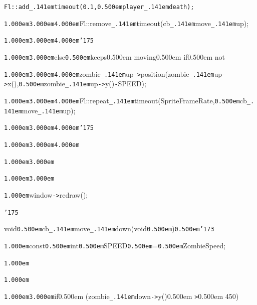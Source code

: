 \documentclass[12pt]{article}
\begin{document}
\noindent
\tt\mc {\tt\mc \kern1.000em}{\tt\mc \kern3.000em}{\tt\mc \kern4.000em}Fl::add{\tt\_\kern.141em}timeout(0.1,{\tt\mc \kern0.500em}player{\tt\_\kern.141em}death);

\noindent
{}{\tt\mc \kern1.000em}{\tt\mc \kern3.000em}{\tt\mc \kern4.000em}Fl::remove{\tt\_\kern.141em}timeout(cb{\tt\_\kern.141em}move{\tt\_\kern.141em}up);

\noindent
{}{\tt\mc \kern1.000em}{\tt\mc \kern3.000em}{\tt\mc \kern4.000em}{\tt\char'175}

\noindent
{}{\tt\mc \kern1.000em}{\tt\mc \kern3.000em}else{\tt\mc \kern0.500em}\rm\mc {\tt /}{\tt /}keeps\kern0.500em moving\kern0.500em if\kern0.500em not

\noindent
\tt{}

\noindent
{}{\tt\mc \kern1.000em}{\tt\mc \kern3.000em}{\tt\mc \kern4.000em}zombie{\tt\_\kern.141em}up{\tt -}{\tt >}position(zombie{\tt\_\kern.141em}up{\tt -}{\tt >}x(),{\tt\mc \kern0.500em}zombie{\tt\_\kern.141em}up{\tt -}{\tt >}y(){\tt -}SPEED);

\noindent
{}{\tt\mc \kern1.000em}{\tt\mc \kern3.000em}{\tt\mc \kern4.000em}Fl::repeat{\tt\_\kern.141em}timeout(SpriteFrameRate,{\tt\mc \kern0.500em}cb{\tt\_\kern.141em}move{\tt\_\kern.141em}up);

\noindent
{}{\tt\mc \kern1.000em}{\tt\mc \kern3.000em}{\tt\mc \kern4.000em}{\tt\char'175}

\noindent
{}{\tt\mc \kern1.000em}{\tt\mc \kern3.000em}{\tt\mc \kern4.000em}

\noindent
{}{\tt\mc \kern1.000em}{\tt\mc \kern3.000em}

\noindent
{}{\tt\mc \kern1.000em}{\tt\mc \kern3.000em}

\noindent
{}{\tt\mc \kern1.000em}window{\tt -}{\tt >}redraw();

\noindent
{}{\tt\char'175}

\noindent
{}\hfill

\noindent
{}void{\tt\mc \kern0.500em}cb{\tt\_\kern.141em}move{\tt\_\kern.141em}down(void{\tt\mc \kern0.500em}{\tt *}){\tt\mc \kern0.500em}{\tt\char'173}

\noindent
{}{\tt\mc \kern1.000em}const{\tt\mc \kern0.500em}int{\tt\mc \kern0.500em}SPEED{\tt\mc \kern0.500em}={\tt\mc \kern0.500em}ZombieSpeed;

\noindent
{}{\tt\mc \kern1.000em}

\noindent
{}{\tt\mc \kern1.000em}

\noindent
{}{\tt\mc \kern1.000em}{\tt\mc \kern3.000em}\rm\mc {\tt /}{\tt /}if\kern0.500em (zombie{\tt\_\kern.141em}down{\tt -}{\tt >}y()\kern0.500em {\tt >}\kern0.500em 450)
\end{document}
